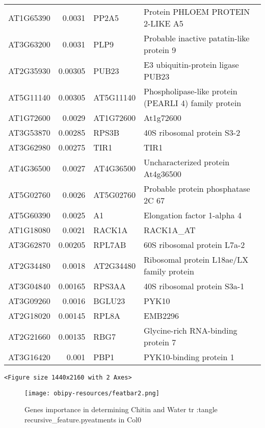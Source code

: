 \documentclass[a4paper]{article}
\begin{document}
\begin{center}
\begin{tabular}{lrll}
AT1G65390 & 0.0031 & PP2A5 & Protein PHLOEM PROTEIN 2-LIKE A5\\
AT3G63200 & 0.0031 & PLP9 & Probable inactive patatin-like protein 9\\
AT2G35930 & 0.00305 & PUB23 & E3 ubiquitin-protein ligase PUB23\\
AT5G11140 & 0.00305 & AT5G11140 & Phospholipase-like protein (PEARLI 4) family protein\\
AT1G72600 & 0.0029 & AT1G72600 & At1g72600\\
AT3G53870 & 0.00285 & RPS3B & 40S ribosomal protein S3-2\\
AT3G62980 & 0.00275 & TIR1 & TIR1\\
AT4G36500 & 0.0027 & AT4G36500 & Uncharacterized protein At4g36500\\
AT5G02760 & 0.0026 & AT5G02760 & Probable protein phosphatase 2C 67\\
AT5G60390 & 0.0025 & A1 & Elongation factor 1-alpha 4\\
AT1G18080 & 0.0021 & RACK1A & RACK1A\_AT\\
AT3G62870 & 0.00205 & RPL7AB & 60S ribosomal protein L7a-2\\
AT2G34480 & 0.0018 & AT2G34480 & Ribosomal protein L18ae/LX family protein\\
AT3G04840 & 0.00165 & RPS3AA & 40S ribosomal protein S3a-1\\
AT3G09260 & 0.0016 & BGLU23 & PYK10\\
AT2G18020 & 0.00145 & RPL8A & EMB2296\\
AT2G21660 & 0.00135 & RBG7 & Glycine-rich RNA-binding protein 7\\
AT3G16420 & 0.001 & PBP1 & PYK10-binding protein 1\\
\end{tabular}
\end{center}

\begin{verbatim}
<Figure size 1440x2160 with 2 Axes>
\end{verbatim}

\begin{figure}[htbp]
\centering
\texttt{[image: obipy-resources/featbar2.png]}
\caption{\label{featbar}
Genes importance in determining Chitin and Water tr :tangle recursive\_feature.pyeatments in Col0}
\end{figure}
\end{document}
